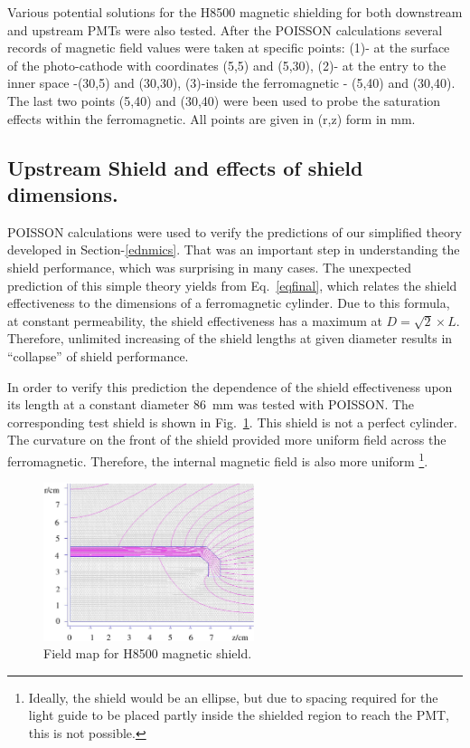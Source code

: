 \documentclass[12pt]{article}
\begin{document}
Various potential solutions for the H8500 magnetic shielding for both  
downstream and upstream PMTs were also tested.
After  the POISSON calculations several  records of  magnetic field values were taken 
at specific  points: 
(1)- at the surface of the photo-cathode with  coordinates  (5,5) and (5,30),
(2)- at the entry to the inner space -(30,5) and (30,30), 
(3)-inside the ferromagnetic - (5,40) and (30,40). 
The last two points (5,40) and (30,40) were been used 
 to probe the saturation effects within the ferromagnetic. All points are given in 
(r,z) form in mm.

\subsection{Upstream Shield  and  effects of  shield dimensions.}
\label{emsdimen}
POISSON calculations were used to verify the predictions of our 
simplified theory developed in Section-\ref{ednmics}.
That was an important step in understanding the shield performance, 
which was surprising in many cases.
The  unexpected prediction of this  simple theory yields  from  
Eq.~\ref{eqfinal}, which  relates the shield
effectiveness to the dimensions of a ferromagnetic cylinder. 
Due to this formula,  at constant permeability, the shield effectiveness has a
maximum at $D =\sqrt{2}\times L$.  Therefore,  unlimited increasing of  
the shield   lengths  at given diameter results in  ``collapse'' 
 of shield performance.

In order to verify this prediction
the dependence of the shield effectiveness upon its length at a constant diameter 
86~mm was tested with POISSON.  The  corresponding test  shield is 
shown in Fig.~\ref{Upstream_PMT_Design}. This  shield is not a 
perfect cylinder. The curvature on the front of the shield provided more uniform 
field across the ferromagnetic.
Therefore,  the internal magnetic field is also more uniform
\footnote{Ideally, the shield would
be an ellipse, but due to spacing required for the light guide to
be placed partly inside the shielded region to reach the PMT, 
this is not possible.}.
%
\begin{figure}%
\centering
\includegraphics[width=0.55\textwidth]{H8500_Upstream_NETIC_6mmThick_69mmLength.eps}
\caption{\small{Field map for H8500 magnetic shield.}}
\label{Upstream_PMT_Design}
\end{figure}
%
\end{document}

